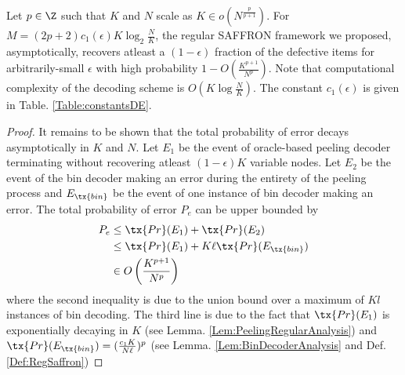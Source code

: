 \documentclass[conference,,twocolumn]{IEEEtran}
\begin{document}
\begin{theorem}
\label{Thm:NoiselessMain}
Let $p\in\Z$ such that $K$ and $N$ scale as $K\in o(N^{\frac{p}{p+1}})$. For $M=(2p+2)c_1(\epsilon)K \log_{2}\frac{N}{K}$, the regular SAFFRON framework we proposed, asymptotically, recovers atleast a $(1-\epsilon)$ fraction of the defective items for arbitrarily-small $\epsilon$ with high probability $1-O\left(\frac{K^{p+1}}{N^p}\right)$. Note that computational complexity of the decoding scheme is $O(K\log \frac{N}{K})$. The constant $c_1(\epsilon)$ is given in Table. \ref{Table:constantsDE}.
\end{theorem}
\begin{proof}
It remains to be shown that the total probability of error decays asymptotically in $K$ and $N$. Let $E_1$ be the event of oracle-based peeling decoder terminating without recovering atleast $(1-\epsilon)K$ variable nodes. Let $E_2$ be the event of the bin decoder making an error during the entirety of the peeling process and $E_{\tx{bin}}$ be the event of one instance of bin decoder making an error. The total probability of error $P_e$ can be upper bounded by 
\begin{align*}
P_e &\leq \tx{Pr}(E_1)+ \tx{Pr}(E_2)\\
               &\leq \tx{Pr}(E_1)+ K\ell\tx{Pr}(E_{\tx{bin}})\\
               &\in O\left(\frac{K^{p+1}}{N^p}\right)
\end{align*}
where the second inequality is due to the union bound over a maximum of $Kl$ instances of bin decoding. The third line is due to the fact that $\tx{Pr}(E_1)$ is exponentially decaying in $K$ (see Lemma. \ref{Lem:PeelingRegularAnalysis}) and $\tx{Pr}(E_{\tx{bin}})=(\frac{c_1K}{N\ell})^p$ (see Lemma. \ref{Lem:BinDecoderAnalysis} and Def. \ref{Def:RegSaffron})
\end{proof}
\end{document}
